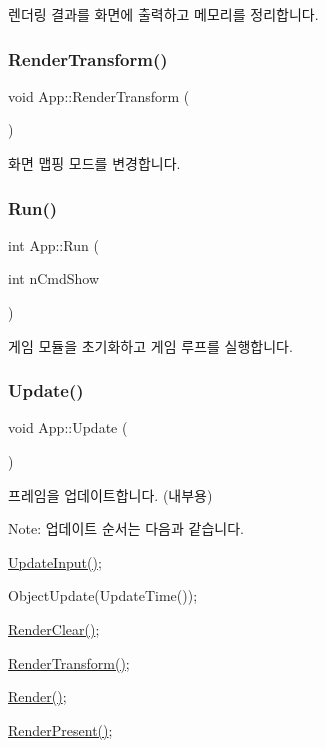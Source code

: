 렌더링 결과를 화면에 출력하고 메모리를 정리합니다. \mbox{\label{class_app_a391b6a41518e0925a3877cb70ea963a3}} 
\subsubsection{\texorpdfstring{RenderTransform()}{RenderTransform()}}
{\footnotesize\ttfamily void App\+::\+Render\+Transform (\begin{DoxyParamCaption}{ }\end{DoxyParamCaption})}

화면 맵핑 모드를 변경합니다. \mbox{\label{class_app_a7dc44068c220d91cc98ce4afe7f97c97}} 
\subsubsection{\texorpdfstring{Run()}{Run()}}
{\footnotesize\ttfamily int App\+::\+Run (\begin{DoxyParamCaption}\item[{int}]{n\+Cmd\+Show }\end{DoxyParamCaption})}

게임 모듈을 초기화하고 게임 루프를 실행합니다. \mbox{\label{class_app_ab080252cbdac21758081b29324351e34}} 
\subsubsection{\texorpdfstring{Update()}{Update()}}
{\footnotesize\ttfamily void App\+::\+Update (\begin{DoxyParamCaption}{ }\end{DoxyParamCaption})}

프레임을 업데이트합니다. (내부용)

Note\+: 업데이트 순서는 다음과 같습니다.
\begin{DoxyEnumerate}
\item \mbox{\hyperlink{class_app_ac7ad6827367a558ac066bb897d0e1ef8}{Update\+Input()}};
\item Object\+Update(\+Update\+Time());
\item \mbox{\hyperlink{class_app_a37267ab01a867e0aa20b99114a1c8b08}{Render\+Clear()}};
\item \mbox{\hyperlink{class_app_a391b6a41518e0925a3877cb70ea963a3}{Render\+Transform()}};
\item \mbox{\hyperlink{class_app_a7f42e947a052412c193c689b7e7a73cc}{Render()}};
\item \mbox{\hyperlink{class_app_a8b06af681cd1bbc4d1683b692cce6249}{Render\+Present()}}; 
\end{DoxyEnumerate}\mbox{\label{class_app_ac7ad6827367a558ac066bb897d0e1ef8}} 
